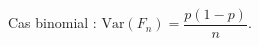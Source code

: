 \documentclass[preview]{standalone}
\begin{document}
\begin{center}
Cas binomial : $\mathrm{Var}(F_n) = \dfrac{p(1-p)}{n}$.
\end{center}
\end{document}
